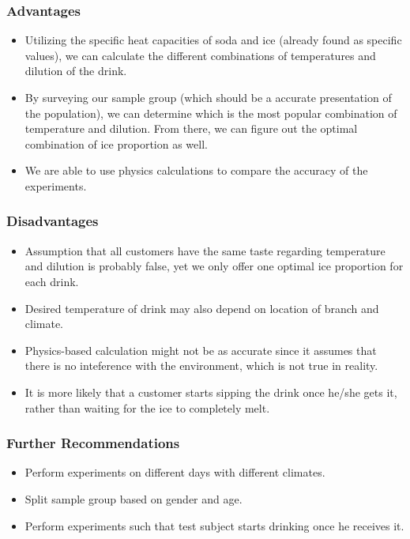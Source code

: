 \documentclass[compress,handout,10pt]{beamer}
\let\olditem\item
\renewcommand{\item}{\setlength{\itemsep}{0.5\baselineskip}\olditem}
\begin{document}
\begin{frame}
    \frametitle{Advantages}

\begin {itemize}
\item Utilizing the specific heat capacities of soda and ice (already found as specific values), we can calculate the different combinations of temperatures and dilution of the drink.
\item By surveying our sample group (which should be a accurate presentation of the population), we can determine which is the most popular combination of temperature and dilution. From there, we can figure out the optimal combination of ice proportion as well.
\item We are able to use physics calculations to compare the accuracy of the experiments.
\end{itemize}

\end{frame}

\begin{frame}
    \frametitle{Disadvantages}

\begin{itemize}
\item Assumption that all customers have the same taste regarding temperature and dilution is probably false, yet we only offer one optimal ice proportion for each drink.
\item Desired temperature of drink may also depend on location of branch and climate.
\item Physics-based calculation might not be as accurate since it assumes that there is no inteference with the environment, which is not true in reality.
\item It is more likely that a customer starts sipping the drink once he/she gets it, rather than waiting for the ice to completely melt.
\end{itemize}

\end{frame}

\begin{frame}
    \frametitle{Further Recommendations}
\begin{itemize}
\item Perform experiments on different days with different climates.
\item Split sample group based on gender and age.
\item Perform experiments such that test subject starts drinking once he receives it.
\end{itemize}
\end{frame}
\end{document}
